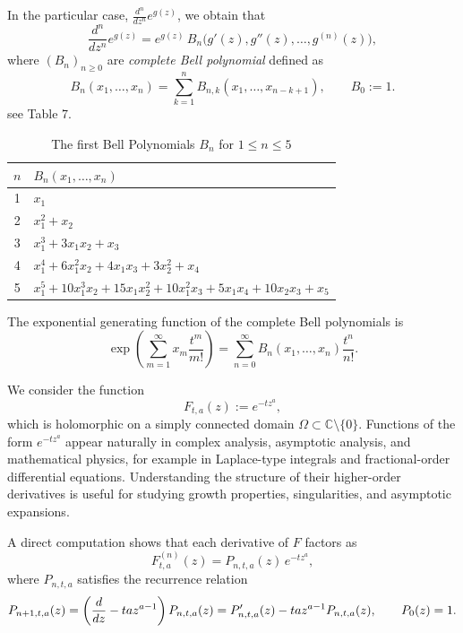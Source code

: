 \documentclass[a4paper,12pt]{amsart}
\theoremstyle{definition}
\theoremstyle{remark}
\begin{document}
In the particular case, $\frac{d^n}{dz^n} e^{g(z)}$, we obtain that
\[
\frac{d^n}{dz^n} e^{g(z)}
=
e^{g(z)}\,
B_n\!\big(g'(z), g''(z), \dots, g^{(n)}(z)\big),
\]
where $(B_n)_{n\ge 0}$ are \emph{complete Bell polynomial} defined as
\[
B_n(x_1,\dots,x_n)
=
\sum_{k=1}^n B_{n,k}(x_1,\dots,x_{n-k+1}),
\qquad B_0 := 1.
\]
see Table 7.

\begin{table}[h]\small{
\centering
\begin{tabular}{c|l}
$n$ & $B_n(x_1, \dots, x_n)$ \\ \hline
1 & $x_1$ \\
2 & $x_1^2 + x_2$ \\
3 & $x_1^3 + 3x_1x_2 + x_3$ \\
4 & $x_1^4 + 6x_1^2x_2 + 4x_1x_3 + 3x_2^2 + x_4$ \\
5 & $x_1^5 + 10x_1^3x_2 + 15x_1x_2^2 + 10x_1^2x_3 + 5x_1x_4 + 10x_2x_3 + x_5$ \\
\end{tabular}
\vspace{2pt}}
\caption{\small The first Bell Polynomials $B_n$ for $1\le n\le 5 $}
\end{table}










The exponential generating function of the complete Bell polynomials is
\[
\exp\!\left(
\sum_{m=1}^\infty x_m \frac{t^m}{m!}
\right)
=
\sum_{n=0}^\infty
B_n(x_1,\dots,x_n)\frac{t^n}{n!}.
\]




We consider the function
\[
F_{t,a}(z):=e^{-t z^{a}},
\]
which is holomorphic on a simply connected domain
$\Omega\subset\mathbb{C}\setminus\{0\}$. Functions of the form $e^{-t z^{a}}$ appear naturally in complex analysis,
asymptotic analysis, and mathematical physics, for example in Laplace-type
integrals and fractional-order differential equations.
Understanding the structure of their higher-order derivatives is useful for
studying growth properties, singularities, and asymptotic expansions.



A direct computation shows that each derivative of $F$ factors as
\begin{equation}\label{derivative}
F^{(n)}_{t,a}(z)=P_{n,t,a}(z)\,e^{-t z^{a}},
\end{equation}
where $P_{n,t,a}$ satisfies the recurrence relation
\begin{equation}
\label{recurrence}
P_{n+1,t,a}(z)=\left({d\over dz}-t a z^{a-1}\right)P_{n,t,a}(z)=P_{n,t,a}'(z)-t a z^{a-1}P_{n,t,a}(z),
\qquad P_0(z)=1.
\end{equation}
\end{document}
